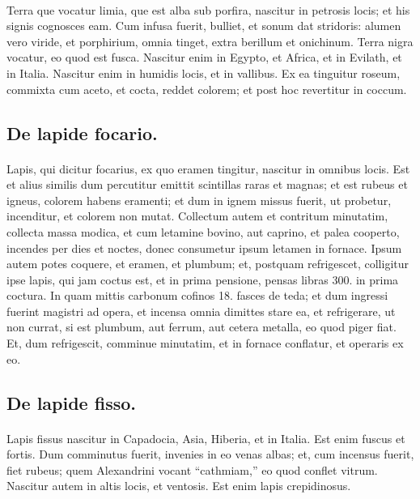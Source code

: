 \documentclass[a4paper, 11pt, oneside, polutonikogreek, italian]{article}
\begin{document}
\paragraph{}
Terra que vocatur limia, que est alba sub porfira, nascitur in petrosis locis; et his signis cognosces eam. Cum infusa fuerit, bulliet, et sonum dat stridoris: alumen vero viride, et porphirium, omnia tinget, extra berillum et onichinum. Terra nigra vocatur, eo quod est fusca. Nascitur enim in Egypto, et Africa, et in Evilath, et in Italia. Nascitur enim in humidis locis, et in vallibus. Ex ea tinguitur roseum, commixta cum aceto, et cocta, reddet colorem; et post hoc revertitur in coccum.

\subsection{De lapide focario.}
\paragraph{}
Lapis, qui dicitur focarius, ex quo eramen tingitur, nascitur in omnibus locis. Est et alius similis dum percutitur emittit scintillas raras et magnas; et est rubeus et igneus, colorem habens eramenti; et dum in ignem missus fuerit, ut probetur, incenditur, et colorem non mutat. Collectum autem et contritum minutatim, collecta massa modica, et cum letamine bovino, aut caprino, et palea cooperto, incendes per dies et noctes, donec consumetur ipsum letamen in fornace. Ipsum autem potes coquere, et eramen, et plumbum; et, postquam refrigescet, colligitur ipse lapis, qui jam coctus est, et in prima pensione, pensas libras 300. in prima coctura. In quam mittis carbonum cofinos 18. fasces de teda; et dum ingressi fuerint magistri ad opera, et incensa omnia dimittes stare ea, et refrigerare, ut non currat, si est plumbum, aut ferrum, aut cetera metalla, eo quod piger fiat. Et, dum refrigescit, comminue minutatim, et in fornace conflatur, et operaris ex eo.

\subsection{De lapide fisso.}
\paragraph{}
Lapis fissus nascitur in Capadocia, Asia, Hiberia, et in Italia. Est enim fuscus et fortis. Dum comminutus fuerit, invenies in eo venas albas; et, cum incensus fuerit, fiet rubeus; quem Alexandrini vocant ``cathmiam,'' eo quod conflet vitrum. Nascitur autem in altis locis, et ventosis. Est enim lapis crepidinosus.
\end{document}
